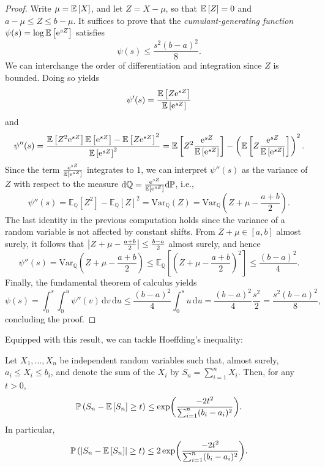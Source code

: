 \begin{proof}
Write $\mu = \mathbb{E}\left[X\right]$, and let $Z = X - \mu$, so that $\mathbb{E}\left[Z\right] = 0$ and $a - \mu \leq Z \leq b - \mu$. It suffices to prove that the \emph{cumulant-generating function} $\psi(s) = \log\mathbb{E}\left[\mathrm{e}^{sZ}\right]$ satisfies
\[
    \psi(s) \leq \frac{s^2(b-a)^2}{8}.
\]
We can interchange the order of differentiation and integration since $Z$ is bounded. Doing so yields
\[
    \psi'(s) = \frac{\mathbb{E}\left[Z\mathrm{e}^{sZ}\right]}{\mathbb{E}\left[\mathrm{e}^{sZ}\right]}
\]
and
\[
    \psi''(s) = \frac{\mathbb{E}\left[Z^2\mathrm{e}^{sZ}\right] \mathbb{E}\left[\mathrm{e}^{sZ}\right] - \mathbb{E}\left[Z\mathrm{e}^{sZ}\right]^2}{\mathbb{E}\left[\mathrm{e}^{sZ}\right]^2} = \mathbb{E}\left[Z^2 \frac{\mathrm{e}^{sZ}}{\mathbb{E}\left[\mathrm{e}^{sZ}\right]}\right] - \left(\mathbb{E}\left[Z \frac{\mathrm{e}^{sZ}}{\mathbb{E}\left[\mathrm{e}^{sZ}\right]}\right]\right)^2.
\]
Since the term $\frac{\mathrm{e}^{sZ}}{\mathbb{E}\left[\mathrm{e}^{sZ}\right]}$ integrates to $1$, we can interpret $\psi''(s)$ as the variance of $Z$ with respect to the measure $\mathrm{d}\mathbb{Q} = \frac{\mathrm{e}^{sZ}}{\mathbb{E}\left[\mathrm{e}^{sZ}\right]} \mathrm{d}\mathbb{P}$, i.e.,
\[
    \psi''(s) = \mathbb{E}_{\mathbb{Q}}[Z^2] - \mathbb{E}_{\mathbb{Q}}[Z]^2 = \mathrm{Var}_{\mathbb{Q}}(Z) = \mathrm{Var}_{\mathbb{Q}}\left(Z + \mu - \frac{a+b}{2}\right).
\]
The last identity in the previous computation holds since the variance of a random variable is not affected by constant shifts. From $Z + \mu \in [a,b]$ almost surely, it follows that $\abs{Z + \mu - \frac{a+b}{2}} \leq \frac{b-a}{2}$ almost surely, and hence
\[
    \psi''(s) = \mathrm{Var}_{\mathbb{Q}}\left(Z + \mu - \frac{a+b}{2}\right) \leq \mathbb{E}_{\mathbb{Q}}\left[\left(Z + \mu - \frac{a+b}{2}\right)^2\right] \leq \frac{(b-a)^2}{4}.
\]
Finally, the fundamental theorem of calculus yields
\[
    \psi(s) = \int_0^s\int_0^u \psi''(v) \, \mathrm{d}v \, \mathrm{d}u \leq \frac{(b-a)^2}{4} \int_0^s u \, \mathrm{d}u = \frac{(b-a)^2}{4} \frac{s^2}{2} = \frac{s^2(b-a)^2}{8},
\]
concluding the proof.
\end{proof}

Equipped with this result, we can tackle Hoeffding's inequality:

\begin{theorem}[Hoeffding, 1963]
\label{thm: hoeffding}
Let $X_1, \dots, X_n$ be independent random variables such that, almost surely, $a_i \leq X_i \leq b_i$, and denote the sum of the $X_i$ by $S_n = \sum_{i=1}^n X_i$. Then, for any $t>0$,
\[
    \mathbb{P}\left(S_n - \mathbb{E}\left[S_n\right] \geq t\right) \leq \exp(\frac{-2t^2}{\sum_{i=1}^n (b_i - a_i)^2}).
\]
In particular,
\[
    \mathbb{P}\left(\abs{S_n - \mathbb{E}\left[S_n\right]} \geq t\right) \leq 2 \exp(\frac{-2t^2}{\sum_{i=1}^n (b_i - a_i)^2}).
\]
\end{theorem}

